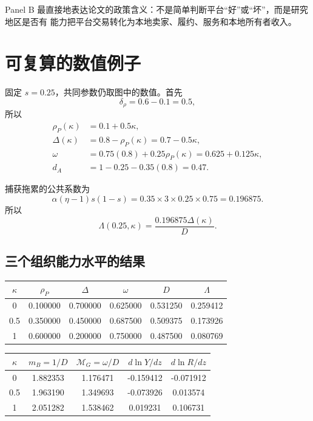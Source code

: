 \documentclass[UTF8,11pt,scheme=chinese,fontset=fandol]{ctexart}
\newcommand{\MG}{\mathcal M_G}
\theoremstyle{definition}
\begin{document}
Panel B 最直接地表达论文的政策含义：不是简单判断平台“好”或“坏”，而是研究地区是否有
能力把平台交易转化为本地卖家、履约、服务和本地所有者收入。

\section{可复算的数值例子}

固定 \(s=0.25\)，共同参数仍取图中的数值。首先
\[
\delta_\rho=0.6-0.1=0.5,
\]
所以
\begin{align}
\rho_P(\kappa)&=0.1+0.5\kappa,\\
\Delta(\kappa)&=0.8-\rho_P(\kappa)=0.7-0.5\kappa,\\
\omega&=0.75(0.8)+0.25\rho_P(\kappa)=0.625+0.125\kappa,\\
d_A&=1-0.25-0.35(0.8)=0.47.
\end{align}

捕获拖累的公共系数为
\[
\alpha(\eta-1)s(1-s)
=0.35\times3\times0.25\times0.75
=0.196875.
\]
所以
\[
\Lambda(0.25,\kappa)=\frac{0.196875\Delta(\kappa)}{D}.
\]

\subsection{三个组织能力水平的结果}

\begin{center}
\small
\begin{tabular}{cccccc}
\toprule
\(\kappa\) & \(\rho_P\) & \(\Delta\) & \(\omega\) & \(D\) & \(\Lambda\) \\
\midrule
0 & 0.100000 & 0.700000 & 0.625000 & 0.531250 & 0.259412 \\
0.5 & 0.350000 & 0.450000 & 0.687500 & 0.509375 & 0.173926 \\
1 & 0.600000 & 0.200000 & 0.750000 & 0.487500 & 0.080769 \\
\bottomrule
\end{tabular}
\end{center}

\begin{center}
\small
\begin{tabular}{ccccc}
\toprule
\(\kappa\) & \(m_B=1/D\) & \(\MG=\omega/D\) & \(d\ln Y/dz\) & \(d\ln R/dz\) \\
\midrule
0 & 1.882353 & 1.176471 & -0.159412 & -0.071912 \\
0.5 & 1.963190 & 1.349693 & -0.073926 & 0.013574 \\
1 & 2.051282 & 1.538462 & 0.019231 & 0.106731 \\
\bottomrule
\end{tabular}
\end{center}
\normalsize
\end{document}
